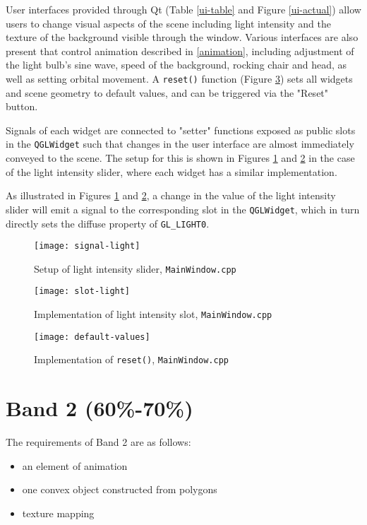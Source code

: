 \documentclass{article}
\begin{document}
		\bigskip
		
		User interfaces provided through Qt (Table \ref{ui-table} and Figure \ref{ui-actual}) allow users to change visual aspects of the scene
		including light intensity and the texture of the background visible through the window. Various interfaces are
		also present that control animation described in \ref{animation}, including
		adjustment of the light bulb's sine wave, speed of the background, rocking chair and head,
		as well as setting orbital movement. A \texttt{reset()} function (Figure \ref{default-values}) sets all widgets and
		scene geometry to
		default values, and can be triggered via the "Reset" button.
		
		\bigskip
		
		Signals of each widget are connected to "setter" functions exposed as public slots in the \texttt{QGLWidget}
		such that changes
		in the user interface are almost immediately conveyed to the scene. The setup for this is shown in
		Figures \ref{signal-light} and
		\ref{slot-light} in the case of the light intensity slider, where each widget has a similar implementation.
		
		\bigskip
		
		As illustrated in Figures \ref{signal-light} and \ref{slot-light}, a change in the value of the light intensity 
		slider will emit a signal to the corresponding slot in the \texttt{QGLWidget}, which in turn directly sets the
		diffuse property of \texttt{GL\_LIGHT0}.
		
		\bigskip
		
		\begin{figure}[htbp]
			\centering	
			\texttt{[image: signal-light]}
			\caption{Setup of light intensity slider, \texttt{MainWindow.cpp}}
			\label{signal-light}
		\end{figure}
		\begin{figure}[htbp]
			\centering	
			\texttt{[image: slot-light]}
			\caption{Implementation of light intensity slot, \texttt{MainWindow.cpp}}
			\label{slot-light}
		\end{figure}
		\begin{figure}[htbp]
			\centering	
			\texttt{[image: default-values]}
			\caption{Implementation of \texttt{reset()}, \texttt{MainWindow.cpp}}
			\label{default-values}
		\end{figure}




	\clearpage
	\section{Band 2 (60\%-70\%)}
		The requirements of Band 2 are as follows:
		\begin{itemize}
			\item an element of animation
			\item one convex object constructed from polygons
			\item texture mapping
		\end{itemize}
\end{document}
